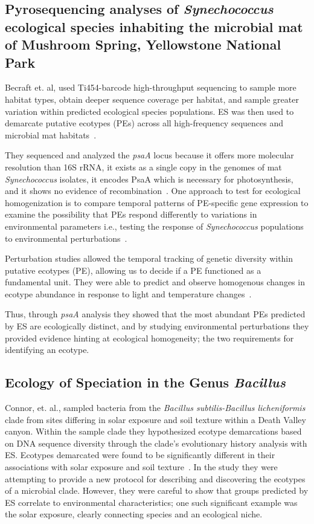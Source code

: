 \subsection*{Pyrosequencing analyses of \emph{Synechococcus} ecological species inhabiting the microbial mat of Mushroom Spring, Yellowstone National Park}
Becraft et. al, used Ti454-barcode high-throughput sequencing to sample more habitat types, obtain deeper sequence coverage per habitat, and sample greater variation within predicted ecological species populations.
ES was then used to demarcate putative ecotypes (PEs) across all high-frequency sequences and microbial mat habitats~\cite{pyroEric}.

They sequenced and analyzed the \emph{psaA} locus because it offers more molecular resolution than 16S rRNA, it exists as a single copy in the genomes of mat \emph{Synechococcus} isolates, it encodes PsaA which is necessary for photosynthesis, and it shows no evidence of recombination~\cite{pyroEric}.
One approach to test for ecological homogenization is to compare temporal patterns of PE-specific gene expression to examine the possibility that PEs respond differently to variations in environmental parameters i.e., testing the response of \emph{Synechococcus} populations to environmental perturbations~\cite{pyroEric}.

Perturbation studies allowed the temporal tracking of genetic diversity within putative ecotypes (PE), allowing us to decide if a PE functioned as a fundamental unit.
They were able to predict and observe homogenous changes in ecotype abundance in response to light and temperature changes~\cite{pyroEric}.

Thus, through \emph{psaA} analysis they showed that the most abundant PEs predicted by ES are ecologically distinct, and by studying environmental perturbations they provided evidence hinting at ecological homogeneity; the two requirements for identifying an ecotype.

\subsection*{Ecology of Speciation in the Genus \emph{Bacillus}}
Connor, et. al., sampled bacteria from the \emph{Bacillus subtilis-Bacillus licheniformis} clade from sites differing in solar exposure and soil texture within a Death Valley canyon.
Within the sample clade they hypothesized ecotype demarcations based on DNA sequence diversity through the clade's evolutionary history analysis with ES.
Ecotypes demarcated were found to be significantly different in their associations with solar exposure and soil texture~\cite{connor2010ecology}.
In the study they were attempting to provide a new protocol for describing and discovering the ecotypes of a microbial clade.
However, they were careful to show that groups predicted by ES correlate to environmental characteristics; one such significant example was the solar exposure, clearly connecting species and an ecological niche.

